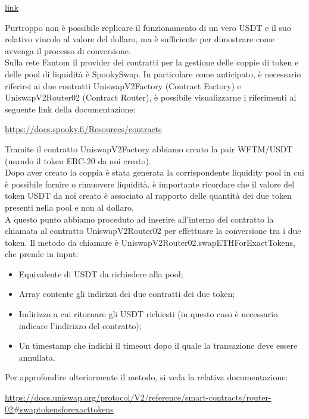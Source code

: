 \href{}{link}

Purtroppo non è possibile replicare il funzionamento di un vero USDT e il suo relativo vincolo al valore del dollaro, ma è sufficiente per dimostrare come avvenga il processo di conversione.\\

Sulla rete Fantom il provider dei contratti per la gestione delle coppie di token e delle pool di liquidità è SpookySwap. In particolare come anticipato, è necessario riferirsi ai due contratti UniswapV2Factory (Contract Factory) e UniswapV2Router02 (Contract Router), è possibile visualizzarne i riferimenti al seguente link della documentazione:

\begin{center}
    \href{https://docs.spooky.fi/Resources/contracts}{https://docs.spooky.fi/Resources/contracts}
\end{center}

Tramite il contratto UniswapV2Factory abbiamo creato la pair WFTM/USDT (usando il token ERC-20 da noi creato).\\ Dopo aver creato la coppia è stata generata la corrispondente liquidity pool in cui è possibile fornire o rimuovere liquidità. 
è importante ricordare che il valore del token USDT da noi creato è associato al rapporto delle quantità dei due token presenti nella pool e non al dollaro.\\

A questo punto abbiamo proceduto ad inserire all'interno del contratto la chiamata al contratto UniswapV2Router02 per effettuare la conversione tra i due token.
Il metodo da chiamare è UniswapV2Router02.swapETHForExactTokens, che prende in input:

\begin{itemize}
    \item Equivalente di USDT da richiedere alla pool;
    \item Array contente gli indirizzi dei due contratti dei due token;
    \item Indirizzo a cui ritornare gli USDT richiesti (in questo caso è necessario indicare l'indirizzo del contratto);
    \item Un timestamp che indichi il timeout dopo il quale la transazione deve essere annullata.
\end{itemize}

Per approfondire ulteriormente il metodo, si veda la relativa documentazione:

\begin{center}
    \href{https://docs.uniswap.org/protocol/V2/reference/smart-contracts/router-02\#swaptokensforexacttokens}{https://docs.uniswap.org/protocol/V2/reference/smart-contracts/router-02\#swaptokensforexacttokens}
\end{center}

